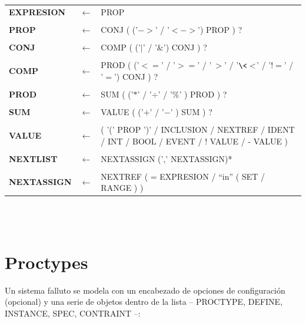 \documentclass[titlepage, 12pt]{book}
\begin{document}
\begin{tabularx}{\textwidth}{>{\bfseries}llX }

EXPRESION & $\longleftarrow$ & PROP\\\\
PROP & $\longleftarrow$ & CONJ ( ('$->$' / '$<->$') PROP ) ?\\\\
CONJ & $\longleftarrow$ & COMP ( ('$|$' / '$\&$') CONJ ) ?\\\\
COMP & $\longleftarrow$ & PROD ( ('$<=$' / '$>=$' / '$\>>$' / '$\<<$' / '$!=$' / '$=$') CONJ ) ?\\\\
PROD & $\longleftarrow$ & SUM ( ('$*$' / '$\div$' / '$\%$' ) PROD ) ?\\\\
SUM & $\longleftarrow$ & VALUE ( ('$+$' / '$-$' ) SUM ) ?\\\\
VALUE & $\longleftarrow$  & ( '(' PROP ')' / INCLUSION / NEXTREF / IDENT / INT / BOOL / EVENT / ! VALUE / - VALUE ) \\\\
NEXTLIST & $\longleftarrow$  & NEXTASSIGN (',' NEXTASSIGN)*\\\\
NEXTASSIGN & $\longleftarrow$  & NEXTREF ( = EXPRESION / ``in'' ( SET / RANGE ) )\\
\end{tabularx}
~\\\\




\section{Proctypes}
Un sistema falluto se modela con un encabezado de opciones de configuraci\'on (opcional) y una serie de objetos dentro de la lista -- PROCTYPE, DEFINE, INSTANCE, SPEC, CONTRAINT --:\\\\
\end{document}
